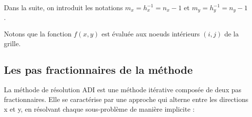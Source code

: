 \documentclass{article}
\begin{document}
 Dans la suite, on introduit les notations $m_x =h_x^{-1} = n_x-1$ et $m_y=h_y^{-1}=n_y -1$.

Notons que la fonction $f(x,y)$ est évaluée aux noeuds intérieurs $(i,j)$ de la grille. 


 
 \subsection{Les pas fractionnaires de la méthode}
    
La méthode de résolution ADI est une méthode itérative composée de deux pas fractionnaires.
Elle se caractérise par une approche qui alterne entre les directions x et y, en résolvant chaque sous-problème de manière implicite :
\end{document}
